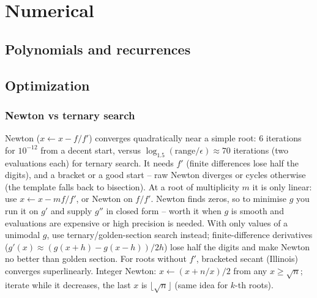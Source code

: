 \chapter{Numerical}

\section{Polynomials and recurrences}

\section{Optimization}
  \subsection{Newton vs ternary search}
	Newton ($x \gets x - f/f'$) converges quadratically near a simple root: \tilde{}6 iterations for $10^{-12}$ from a decent start, versus $\log_{1.5}(\text{range}/\epsilon) \approx 70$ iterations (two evaluations each) for ternary search. It needs $f'$ (finite differences lose half the digits), and a bracket or a good start -- raw Newton diverges or cycles otherwise (the template falls back to bisection). At a root of multiplicity $m$ it is only linear: use $x \gets x - m f/f'$, or Newton on $f/f'$. Newton finds zeros, so to minimise $g$ you run it on $g'$ and supply $g''$ in closed form -- worth it when $g$ is smooth and evaluations are expensive or high precision is needed. With only values of a unimodal $g$, use ternary/golden-section search instead; finite-difference derivatives ($g'(x) \approx (g(x+h)-g(x-h))/2h$) lose half the digits and make Newton no better than golden section. For roots without $f'$, bracketed secant (Illinois) converges superlinearly. Integer Newton: $x \gets (x + n/x)/2$ from any $x \ge \sqrt n$; iterate while it decreases, the last $x$ is $\lfloor\sqrt n\rfloor$ (same idea for $k$-th roots).
